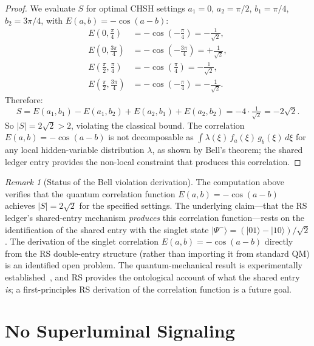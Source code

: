 \documentclass[12pt,a4paper]{article}
\theoremstyle{definition}
\theoremstyle{remark}
\newtheorem{remark}[theorem]{Remark}
\begin{document}
\begin{proof}
We evaluate $S$ for optimal CHSH settings $a_1 = 0$, $a_2 = \pi/2$,
$b_1 = \pi/4$, $b_2 = 3\pi/4$, with $E(a,b) = -\cos(a - b)$:
\begin{align*}
  E(0,\tfrac{\pi}{4}) &= -\cos(-\tfrac{\pi}{4}) = -\tfrac{1}{\sqrt{2}},\\
  E(0,\tfrac{3\pi}{4}) &= -\cos(-\tfrac{3\pi}{4}) = +\tfrac{1}{\sqrt{2}},\\
  E(\tfrac{\pi}{2},\tfrac{\pi}{4}) &= -\cos(\tfrac{\pi}{4}) = -\tfrac{1}{\sqrt{2}},\\
  E(\tfrac{\pi}{2},\tfrac{3\pi}{4}) &= -\cos(-\tfrac{\pi}{4}) = -\tfrac{1}{\sqrt{2}}.
\end{align*}
Therefore:
\begin{equation}
  S = E(a_1,b_1) - E(a_1,b_2) + E(a_2,b_1) + E(a_2,b_2)
  = -4 \cdot \tfrac{1}{\sqrt{2}}
  = -2\sqrt{2}.
\end{equation}
So $|S| = 2\sqrt{2} > 2$, violating the classical bound.
The correlation $E(a,b) = -\cos(a-b)$ is not decomposable as
$\int \lambda(\xi)\,f_a(\xi)\,g_b(\xi)\,d\xi$ for any local
hidden-variable distribution $\lambda$, as shown by Bell's
theorem; the shared ledger entry provides the non-local constraint
that produces this correlation.
\end{proof}

\begin{remark}[Status of the Bell violation derivation]
\label{rem:bell-status}
The computation above verifies that the quantum correlation
function $E(a,b) = -\cos(a-b)$ achieves $|S| = 2\sqrt{2}$ for
the specified settings.  The underlying claim---that the RS
ledger's shared-entry mechanism \emph{produces} this correlation
function---rests on the identification of the shared entry with
the singlet state $|\Psi^-\rangle = (|01\rangle -
|10\rangle)/\sqrt{2}$.  The derivation of the singlet correlation
$E(a,b) = -\cos(a-b)$ directly from the RS double-entry structure
(rather than importing it from standard QM) is an identified open
problem.  The quantum-mechanical result is experimentally
established~\cite{Aspect1982}, and RS provides the ontological
account of what the shared entry \emph{is}; a first-principles
RS derivation of the correlation function is a future goal.
\end{remark}

\section{No Superluminal Signaling}
\label{sec:no-signaling}
\end{document}
